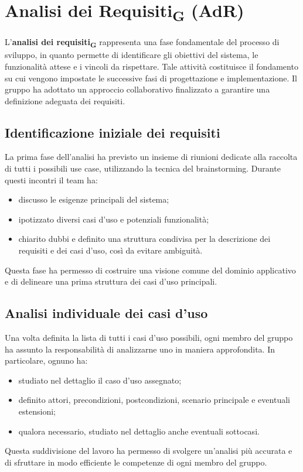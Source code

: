 \documentclass[11pt,a4paper]{article}
\newcommand{\gls}[1]{#1\textsubscript{G}}
\begin{document}
\newpage

\section{\gls{Analisi dei Requisiti} (AdR)}
L’\textbf{\gls{analisi dei requisiti}} rappresenta una fase fondamentale del processo di sviluppo, in quanto permette di identificare gli obiettivi del sistema, le funzionalità attese e i vincoli da rispettare. Tale attività costituisce il fondamento su cui vengono impostate le successive fasi di progettazione e implementazione. 
Il gruppo ha adottato un approccio collaborativo finalizzato a garantire una definizione adeguata dei requisiti.

\subsection{Identificazione iniziale dei requisiti}
La prima fase dell’analisi ha previsto un insieme di riunioni dedicate alla raccolta di tutti i possibili use case, utilizzando la tecnica del brainstorming. Durante questi incontri il team ha:
\begin{itemize}
\item discusso le esigenze principali del sistema;
\item ipotizzato diversi casi d’uso e potenziali funzionalità;
\item chiarito dubbi e definito una struttura condivisa per la descrizione dei requisiti e dei casi d’uso, così da evitare ambiguità.
\end{itemize}
Questa fase ha permesso di costruire una visione comune del dominio applicativo e di delineare una prima struttura dei casi d’uso principali.

\subsection{Analisi individuale dei casi d'uso}
Una volta definita la lista di tutti i casi d’uso possibili, ogni membro del gruppo ha assunto la responsabilità di analizzarne uno in maniera approfondita. In particolare, ognuno ha:
\begin{itemize}
\item studiato nel dettaglio il caso d’uso assegnato;
\item definito attori, precondizioni, postcondizioni, scenario principale e eventuali estensioni;
\item qualora necessario, studiato nel dettaglio anche eventuali sottocasi.
\end{itemize}
Questa suddivisione del lavoro ha permesso di svolgere un’analisi più accurata e di sfruttare in modo efficiente le competenze di ogni membro del gruppo.
\end{document}
